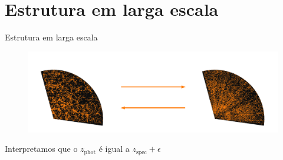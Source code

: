 \section{Estrutura em larga escala}
\begin{frame}[c]{Estrutura em larga escala}
    \begin{figure}
        \centering
        \includegraphics[width=\linewidth]{script/images/lss_problem.pdf}
    \end{figure}
    \centering
    \begin{tcolorbox}[hbox] %
        Interpretamos que o $z_\text{phot}$ é igual a $z_\text{spec} + \epsilon$
    \end{tcolorbox}
\end{frame}





